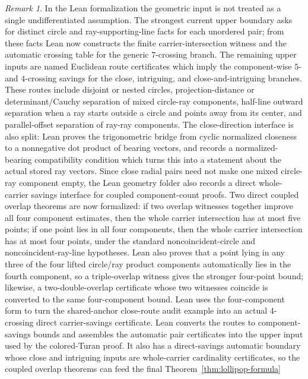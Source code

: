 \documentclass[12pt]{article}
\theoremstyle{plain}
\theoremstyle{definition}
\theoremstyle{remark}
\newtheorem{remark}[theorem]{Remark}
\begin{document}
\begin{remark}
In the Lean formalization the geometric input is not treated as a single
undifferentiated assumption.  The strongest current upper boundary asks for
distinct circle and ray-supporting-line facts for each unordered pair; from
these facts Lean now constructs the finite carrier-intersection witness and
the automatic crossing table for the generic \(7\)-crossing branch.  The
remaining upper inputs are named Euclidean route certificates which imply the
component-wise \(5\)- and \(4\)-crossing savings for the close, intriguing, and
close-and-intriguing branches.  These routes include disjoint or nested
circles, projection-distance or determinant/Cauchy separation of mixed
circle-ray components, half-line outward separation when a ray starts outside a
circle and points away from its center, and parallel-offset separation of
ray-ray components.
The close-direction interface is also split: Lean proves the trigonometric
bridge from cyclic normalized closeness to a nonnegative dot product of
bearing vectors, and records a normalized-bearing compatibility condition
which turns this into a statement about the actual stored ray vectors.
Since close radial pairs need not make one mixed circle-ray component empty,
the Lean geometry folder also records a direct whole-carrier savings interface
for coupled component-count proofs.  Two direct coupled overlap theorems are
now formalized: if two overlap witnesses together improve all four component
estimates, then the whole carrier intersection has at most five points; if one
point lies in all four components, then the whole carrier intersection has at
most four points, under the standard noncoincident-circle and
noncoincident-ray-line hypotheses.  Lean also proves that a point lying in any
three of the four lifted circle/ray product components automatically lies in
the fourth component, so a triple-overlap witness gives the stronger
four-point bound; likewise, a two-double-overlap certificate whose two
witnesses coincide is converted to the same four-component bound.  Lean uses
the four-component form to turn
the shared-anchor close-route audit example into an actual \(4\)-crossing
direct carrier-savings certificate.
Lean converts the routes to component-savings bounds and assembles the
automatic pair certificates into the upper input used by the colored-Turan
proof.  It also has a direct-savings automatic boundary whose close and
intriguing inputs are whole-carrier cardinality certificates, so the coupled
overlap theorems can feed the final Theorem~\ref{thm:lollipop-formula}

\end{remark}
\end{document}
